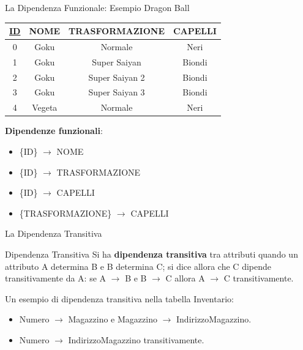 \begin{frame}{La Dipendenza Funzionale: Esempio Dragon Ball}
    
\begin{table}[h]
    \centering
    \begin{tabular}{|c|c|c|c|}
        \hline
        \rowcolor{cyan!30} \textbf{\underline{ID}} & \textbf{NOME} & \textbf{TRASFORMAZIONE} & \textbf{CAPELLI} \\ \hline
        0 & Goku & Normale & Neri \\ \hline
        1 & Goku & Super Saiyan & Biondi \\ \hline
        2 & Goku & Super Saiyan 2 & Biondi \\ \hline
        3 & Goku & Super Saiyan 3 & Biondi \\ \hline
        4 & Vegeta & Normale & Neri \\ \hline
    \end{tabular}
\end{table}
\pause
\textbf{Dipendenze funzionali}:
\pause
\begin{itemize}[<+->]
    \item \{ID\} $ \rightarrow $ NOME
    \item \{ID\} $ \rightarrow $ TRASFORMAZIONE
    \item \{ID\} $ \rightarrow $ CAPELLI
    \item \{TRASFORMAZIONE\} $ \rightarrow $ CAPELLI
\end{itemize}
\end{frame}
%
\begin{frame}{La Dipendenza Transitiva}
    \begin{block}{Dipendenza Transitiva}
        Si ha \textbf{dipendenza transitiva} tra attributi quando un attributo A determina B e B determina C; si dice allora che C dipende transitivamente da A: se A $ \rightarrow $ B e B $ \rightarrow $ C allora A $ \rightarrow $ C transitivamente.
    \end{block}
Un esempio di dipendenza transitiva nella tabella Inventario:
    \begin{itemize}[<+->]
        \item Numero $ \rightarrow $ Magazzino e Magazzino $ \rightarrow $ IndirizzoMagazzino.
        \item Numero $ \rightarrow $ IndirizzoMagazzino transitivamente.
    \end{itemize}
\end{frame}
